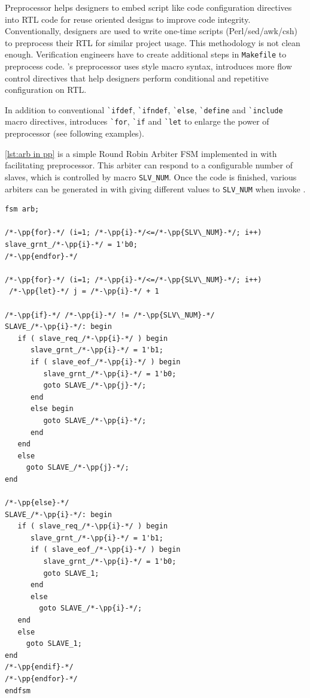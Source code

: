 Preprocessor helps designers to embed script like
code configuration directives into RTL code for reuse
oriented designs to improve code integrity. Conventionally,
designers are used to write one-time scripts (Perl/sed/awk/csh)
to preprocess their RTL for similar project usage. This methodology
is not clean enough. Verification engineers have to create additional
steps in \texttt{Makefile} to preprocess code.
\mhdl{}'s preprocessor uses \vlog{} style macro syntax, introduces
more flow control directives that help designers perform conditional and
repetitive configuration on RTL.

In addition to conventional \texttt{\`{}ifdef}, \texttt{\`{}ifndef},
\texttt{\`{}else}, \texttt{\`{}define} and \texttt{\`{}include}
macro directives, \mhdl{} introduces \texttt{\`{}for}, \texttt{\`{}if} and
\texttt{\`{}let} to enlarge the power of preprocessor (see following examples).

\autoref{lst:arb in pp} is a simple Round Robin Arbiter FSM implemented
in \mhdl{} with facilitating preprocessor. This arbiter can respond to
a configurable number of slaves, which is controlled by macro \texttt{SLV\_NUM}.
Once the \mhdl{} code is finished, various arbiters can be generated in \sv{} with
giving different values to \texttt{SLV\_NUM} when invoke \mhdlc{}.

\begin{lstlisting}[caption={Configurable Arbiter}, label={lst:arb in pp}]
fsm arb;

/*-\pp{for}-*/ (i=1; /*-\pp{i}-*/<=/*-\pp{SLV\_NUM}-*/; i++)
slave_grnt_/*-\pp{i}-*/ = 1'b0;
/*-\pp{endfor}-*/

/*-\pp{for}-*/ (i=1; /*-\pp{i}-*/<=/*-\pp{SLV\_NUM}-*/; i++)
 /*-\pp{let}-*/ j = /*-\pp{i}-*/ + 1

/*-\pp{if}-*/ /*-\pp{i}-*/ != /*-\pp{SLV\_NUM}-*/
SLAVE_/*-\pp{i}-*/: begin
   if ( slave_req_/*-\pp{i}-*/ ) begin
      slave_grnt_/*-\pp{i}-*/ = 1'b1;
      if ( slave_eof_/*-\pp{i}-*/ ) begin
         slave_grnt_/*-\pp{i}-*/ = 1'b0;
         goto SLAVE_/*-\pp{j}-*/;
      end
      else begin
         goto SLAVE_/*-\pp{i}-*/;
      end
   end
   else
     goto SLAVE_/*-\pp{j}-*/;
end

/*-\pp{else}-*/
SLAVE_/*-\pp{i}-*/: begin
   if ( slave_req_/*-\pp{i}-*/ ) begin
      slave_grnt_/*-\pp{i}-*/ = 1'b1;
      if ( slave_eof_/*-\pp{i}-*/ ) begin
         slave_grnt_/*-\pp{i}-*/ = 1'b0;
         goto SLAVE_1;
      end
      else
        goto SLAVE_/*-\pp{i}-*/;
   end
   else
     goto SLAVE_1;
end
/*-\pp{endif}-*/
/*-\pp{endfor}-*/
endfsm
\end{lstlisting}

